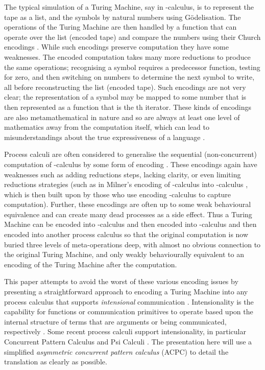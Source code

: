 \documentclass[submission,copyright,creativecommons]{eptcs}
\begin{document}
The typical simulation of a Turing Machine, say in -calculus, is to
represent the tape as a list, and the symbols by natural numbers using G\"odelisation.
The operations of the Turing Machine are then handled by a function that
can operate over the list (encoded tape) and compare the numbers using their
Church encodings \cite{Barendregt85}.
While such encodings preserve computation they have some weaknesses.
The encoded computation takes many more reductions to produce the same operations;
recognising a symbol requires a predecessor function, testing for zero, and then
switching on numbers to determine the next symbol to write, all before
reconstructing the list (encoded tape).
Such encodings are not very clear; the representation of a symbol  may be
mapped to some number  that is then represented as a function that is the
th iterator.
These kinds of encodings are also metamathematical \cite{Tarski56logic} in nature and
so are always at least one level of mathematics away from the computation itself,
which can lead to misunderstandings about the true expressiveness of a
language \cite{jay2011}.

Process calculi are often considered to generalise the sequential (non-concurrent)
computation of -calculus by some form of encoding
\cite{90426,Berry:1989:CAM:96709.96717,Milner:1992:CMP:162037.162038,Milner:1992:CMP:162037.162039,DBLP:conf/fossacs/CardelliG98,DBLP:books/daglib/0098267,
705654}.
These encodings again have weaknesses such as adding reductions steps,
lacking clarity, or even limiting reductions strategies (such as in
Milner's encoding of -calculus into -calculus \cite{90426}, which is
then built upon by those who use encoding -calculus to capture
computation).
Further, these encodings are often up to some weak behavioural equivalence and
can create many dead processes as a side effect.
Thus a Turing Machine can be encoded into -calculus and then encoded into
-calculus and then encoded into another process calculus so that the 
original computation is now buried three levels of meta-operations deep,
with almost no obvious connection to the original Turing Machine,
and only weakly behaviourally equivalent to an encoding of the Turing Machine
after the computation.

This paper attempts to avoid the worst of these various encoding issues by
presenting a straightforward approach to encoding a Turing Machine into any process
calculus that supports {\em intensional} communication
\cite{GivenWilsonPhD,GivenWilsonGorla13}.
Intensionality is the capability for functions or communication primitives
to operate based upon the internal structure of terms that are arguments
or being communicated, respectively \cite{jay2011,GivenWilsonPhD}.
Some recent process calculi support intensionality, in particular
Concurrent Pattern Calculus \cite{GivenWilsonGorlaJay10,givenwilson:hal-00987578} and
Psi Calculi \cite{BJPV11}.
The presentation here will use a simplified {\em asymmetric concurrent
pattern calculus} (ACPC) to detail the translation as clearly as possible.
\end{document}
